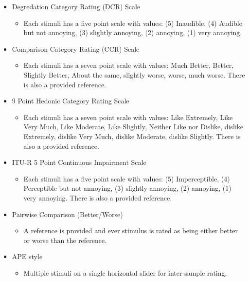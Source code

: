 \documentclass{sig-alternate}
\begin{document}
\begin{itemize}[noitemsep,nolistsep]
		\item Degredation Category Rating (DCR) Scale~\cite{rec1996p}
		\begin{itemize}[noitemsep,nolistsep]
			\item Each stimuli has a five point scale with values: (5) Inaudible, (4) Audible but not annoying, (3) slightly annoying, (2) annoying, (1) very annoying.
		\end{itemize}
		\item Comparison Category Rating (CCR) Scale~\cite{rec1996p}
		\begin{itemize}[noitemsep,nolistsep]
			\item Each stimuli has a seven point scale with values: Much Better, Better, Slightly Better, About the same, slightly worse, worse, much worse. There is also a provided reference.
		\end{itemize}
		\item 9 Point Hedonic Category Rating Scale~\cite{peryam1952advanced}
		\begin{itemize}[noitemsep,nolistsep]
			\item Each stimuli has a seven point scale with values: Like Extremely, Like Very Much, Like Moderate, Like Slightly, Neither Like nor Dislike, dislike Extremely, dislike Very Much, dislike Moderate, dislike Slightly. There is also a provided reference.
			\end{itemize}
		\item ITU-R 5 Point Continuous Impairment Scale~\cite{rec1997bs}
		\begin{itemize}[noitemsep,nolistsep]
			\item Each stimuli has a five point scale with values: (5) Imperceptible, (4) Perceptible but not annoying, (3) slightly annoying, (2) annoying, (1) very annoying. There is also a provided reference.
		\end{itemize}
		\item Pairwise Comparison (Better/Worse)~\cite{david1963method}
		\begin{itemize}[noitemsep,nolistsep]
			\item A reference is provided and ever stimulus is rated as being either better or worse than the reference.
		\end{itemize}
		\item APE style \cite{ape}
		\begin{itemize}[noitemsep,nolistsep]
			\item Multiple stimuli on a single horizontal slider for inter-sample rating.
		\end{itemize}

\end{itemize}
\end{document}

